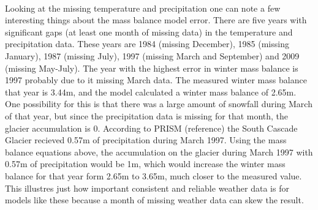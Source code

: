 \documentclass{article}
\begin{document}
\paragraph{}
Looking at the missing temperature and precipitation one can note a few interesting things about the mass balance model error. There are five years 
with significant gaps (at least one month of missing data) in the temperature and precipitation data. These years are 1984 (missing December), 
1985 (missing January), 1987 (missing July), 1997 (missing March and September) and 2009 (missing May-July). The year with the highest error in 
winter mass balance is 1997 probably due to it missing March data. The measured winter mass balance that year is 3.44m, and the model calculated a 
winter mass balance of 2.65m. One possibility for this is that there was a large amount of snowfall during March of that year, but since the 
precipitation data is missing for that month, the glacier accumulation is 0. According to PRISM (reference) the South Cascade Glacier recieved 0.57m 
of precipitation during March 1997. Using the mass balance equations above, the accumulation on the glacier during March 1997 with 0.57m of 
precipitation would be 1m, which would increase the winter mass balance for that year form 2.65m to 3.65m, much closer to the measured value. This 
illustres just how important consistent and reliable weather data is for models like these because a month of missing weather data can skew the 
result. 
\end{document}
